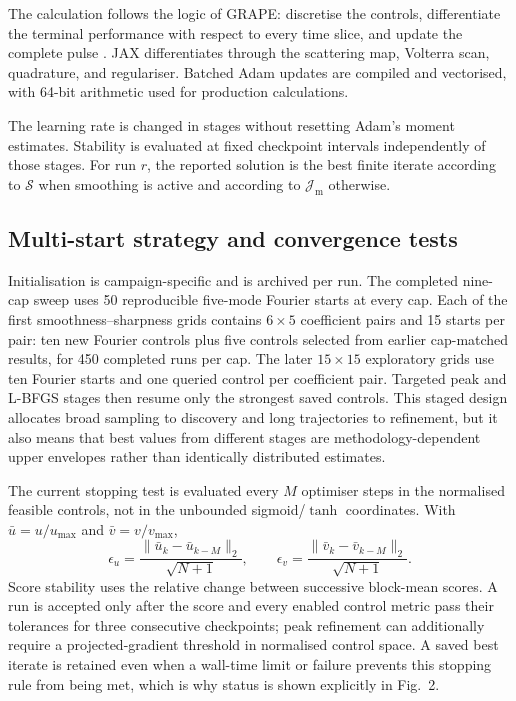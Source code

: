 \documentclass[9pt,a4paper,twocolumn,twoside]{rho-class/rho}
\newcommand{\Jmol}{\mathcal{J}_{\mathrm{m}}}
\begin{document}
        The calculation follows the logic of GRAPE: discretise the controls, differentiate the terminal performance with respect to every time slice, and update the complete pulse \cite{khaneja2005optimal}. JAX differentiates through the scattering map, Volterra scan, quadrature, and regulariser. Batched Adam updates are compiled and vectorised, with 64-bit arithmetic used for production calculations.

        The learning rate is changed in stages without resetting Adam's moment estimates. Stability is evaluated at fixed checkpoint intervals independently of those stages. For run $r$, the reported solution is the best finite iterate according to $\mathcal{S}$ when smoothing is active and according to $\Jmol$ otherwise.

    \subsection{Multi-start strategy and convergence tests}

        Initialisation is campaign-specific and is archived per run. The completed nine-cap sweep uses 50 reproducible five-mode Fourier starts at every cap. Each of the first smoothness--sharpness grids contains $6\times5$ coefficient pairs and 15 starts per pair: ten new Fourier controls plus five controls selected from earlier cap-matched results, for 450 completed runs per cap. The later $15\times15$ exploratory grids use ten Fourier starts and one queried control per coefficient pair. Targeted peak and L-BFGS stages then resume only the strongest saved controls. This staged design allocates broad sampling to discovery and long trajectories to refinement, but it also means that best values from different stages are methodology-dependent upper envelopes rather than identically distributed estimates.

        The current stopping test is evaluated every $M$ optimiser steps in the normalised feasible controls, not in the unbounded sigmoid/$\tanh$ coordinates. With $\bar u=u/u_{\max}$ and $\bar v=v/v_{\max}$,
        \begin{equation}\label{eq:physical-control-stability}
            \epsilon_u=\frac{\|\bar u_k-\bar u_{k-M}\|_2}{\sqrt{N+1}},\qquad
            \epsilon_v=\frac{\|\bar v_k-\bar v_{k-M}\|_2}{\sqrt{N+1}}.
        \end{equation}
        Score stability uses the relative change between successive block-mean scores. A run is accepted only after the score and every enabled control metric pass their tolerances for three consecutive checkpoints; peak refinement can additionally require a projected-gradient threshold in normalised control space. A saved best iterate is retained even when a wall-time limit or failure prevents this stopping rule from being met, which is why status is shown explicitly in Fig.~2.
\end{document}
